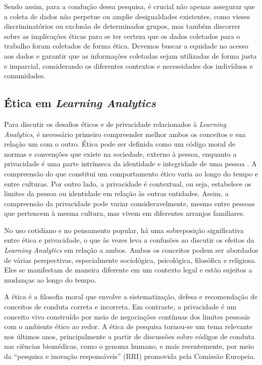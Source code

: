 Sendo assim, para a condução dessa pesquisa, é crucial não apenas assegurar que a coleta de dados não perpetue ou amplie desigualdades existentes, como vieses discriminatórios ou exclusão de determinados grupos, mas também discorrer sobre as implicações éticas para se ter certeza que os dados coletados para o trabalho foram coletados de forma ética. Devemos buscar a equidade no acesso aos dados e garantir que as informações coletadas sejam utilizadas de forma justa e imparcial, considerando os diferentes contextos e necessidades dos indivíduos e comunidades.

\subsection{Ética em \textit{Learning Analytics}}

Para discutir os desafios éticos e de privacidade relacionados à \textit{Learning Analytics}, é necessário primeiro compreender melhor ambos os conceitos e sua relação um com o outro. Ética pode ser definida como um código moral de normas e convenções que existe na sociedade, externo à pessoa, enquanto a privacidade é uma parte intrínseca da identidade e integridade de uma pessoa \cite{Drachsler2016}. A compreensão do que constitui um comportamento ético varia ao longo do tempo e entre culturas. Por outro lado, a privacidade é contextual, ou seja, estabelece os limites da pessoa ou identidade em relação às outras entidades. Assim, a compreensão da privacidade pode variar consideravelmente, mesmo entre pessoas que pertencem à mesma cultura, mas vivem em diferentes arranjos familiares.

No uso cotidiano e no pensamento popular, há uma sobreposição significativa entre ética e privacidade, o que às vezes leva a confusões ao discutir os efeitos da \textit{Learning Analytics} em relação a ambos. Ambos os conceitos podem ser abordados de várias perspectivas, especialmente sociológica, psicológica, filosófica e religiosa. Eles se manifestam de maneira diferente em um contexto legal e estão sujeitos a mudanças ao longo do tempo.

A ética é a filosofia moral que envolve a sistematização, defesa e recomendação de conceitos de conduta correta e incorreta. Em contraste, a privacidade é um conceito vivo construído por meio de negociações contínuas dos limites pessoais com o ambiente ético ao redor. A ética de pesquisa tornou-se um tema relevante nos últimos anos, principalmente a partir de discussões sobre códigos de conduta nas ciências biomédicas, como o genoma humano, e mais recentemente, por meio da ``pesquisa e inovação responsáveis'' (RRI) promovida pela Comissão Europeia.

